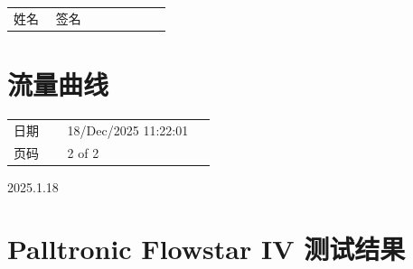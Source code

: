 \documentclass[UTF8,10pt,a4paper,fontset=fandol]{ctexart}
\newcommand{\fieldvalue}[1]{#1}
\newcommand{\handwritten}[1]{#1}
\begin{document}
\begin{tabular}{@{}p{0.24\linewidth}p{0.66\linewidth}@{}}
姓名 &
\fieldvalue{\handwritten{签名}}
\\
\end{tabular}

\section{流量曲线}

\begin{tabular}{@{}p{0.24\linewidth}p{0.66\linewidth}@{}}
日期 &
\fieldvalue{18/Dec/2025 11:22:01}
\\
页码 &
\fieldvalue{2 of 2}
\\
\end{tabular}

\begin{center}
\setlength{\fboxsep}{6pt}
\end{center}

\handwritten{2025.1.18}

\newpage

\section{Palltronic Flowstar IV 测试结果}
\end{document}
